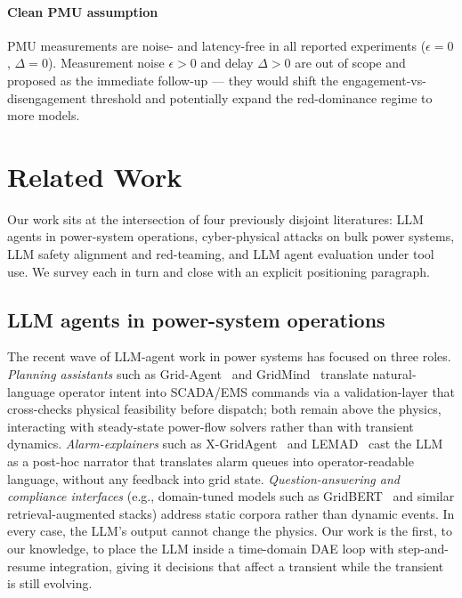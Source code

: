\documentclass[journal,twocolumn,10pt]{IEEEtran}
\begin{document}
\paragraph*{Clean PMU assumption} PMU measurements are noise- and latency-free in all reported experiments ($\epsilon = 0$, $\Delta = 0$). Measurement noise $\epsilon > 0$ and delay $\Delta > 0$ are out of scope and proposed as the immediate follow-up --- they would shift the engagement-vs-disengagement threshold and potentially expand the red-dominance regime to more models.

\section{Related Work}
\label{sec:related}

Our work sits at the intersection of four previously disjoint literatures: LLM agents in power-system operations, cyber-physical attacks on bulk power systems, LLM safety alignment and red-teaming, and LLM agent evaluation under tool use. We survey each in turn and close with an explicit positioning paragraph.

\subsection{LLM agents in power-system operations}

The recent wave of LLM-agent work in power systems has focused on three roles. \emph{Planning assistants} such as Grid-Agent~\cite{grid-agent} and GridMind~\cite{gridmind} translate natural-language operator intent into SCADA/EMS commands via a validation-layer that cross-checks physical feasibility before dispatch; both remain above the physics, interacting with steady-state power-flow solvers rather than with transient dynamics. \emph{Alarm-explainers} such as X-GridAgent~\cite{xgridagent} and LEMAD~\cite{lemad} cast the LLM as a post-hoc narrator that translates alarm queues into operator-readable language, without any feedback into grid state. \emph{Question-answering and compliance interfaces} (e.g., domain-tuned models such as GridBERT~\cite{gridbert} and similar retrieval-augmented stacks) address static corpora rather than dynamic events. In every case, the LLM's output cannot change the physics. Our work is the first, to our knowledge, to place the LLM inside a time-domain DAE loop with step-and-resume integration, giving it decisions that affect a transient while the transient is still evolving.
\end{document}
